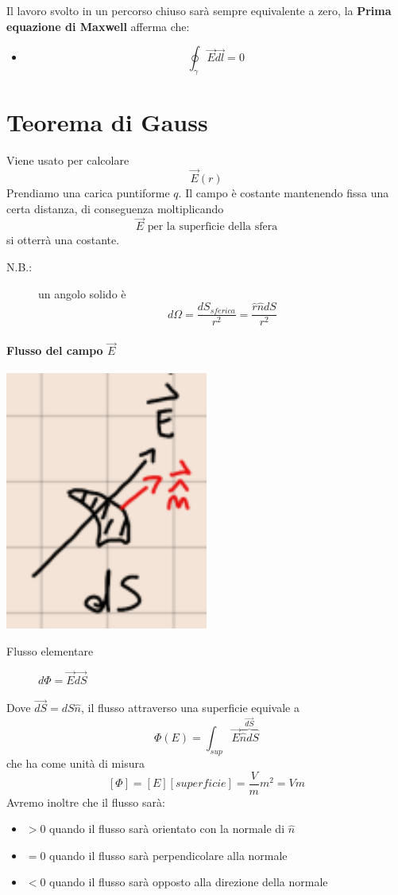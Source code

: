 \documentclass[a4paper, 12pt]{book}
\theoremstyle{plain}
\begin{document}
Il lavoro svolto in un percorso chiuso sarà sempre equivalente a zero, la \textbf{Prima equazione di Maxwell} afferma che:
\begin{itemize}
	\item \[\oint_{\gamma} \vec{E}\vec{dl} = 0 \]
\end{itemize}

\section{Teorema di Gauss}

Viene usato per calcolare \[\vec{E}(r)\] Prendiamo una carica puntiforme $q$. Il campo è costante mantenendo fissa una certa distanza, di conseguenza moltiplicando \[\vec{E}\textrm{ per la superficie della sfera}\] si otterrà una costante.

\begin{description}
	\item[N.B.:] un angolo solido è \[d\Omega = \frac{dS_{sferica}}{r^2} = \frac{\hat{r}\hat{n}dS}{r^2}\]
\end{description}

\paragraph{Flusso del campo $\vec{E}$}

\begin{center}
	\includegraphics[width=0.5\textwidth]{flusso.png}
\end{center}
\begin{description}
	\item[Flusso elementare] $d\Phi = \vec{E}\vec{dS}$
\end{description}
Dove $\vec{dS} = dS\hat{n}$, il flusso attraverso una superficie equivale a \[\Phi(E) = \int_{sup} \vec{E}\overbrace{\hat{n}dS}^{\vec{dS}}\] che ha come unità di misura \[[\Phi] = [E][superficie] = \frac{V}{m}m^2 = Vm\]
Avremo inoltre che il flusso sarà:
\begin{itemize}
	\item $> 0$ quando il flusso sarà orientato con la normale di $\hat{n}$
	\item $= 0$ quando il flusso sarà perpendicolare alla normale
	\item $< 0$ quando il flusso sarà opposto alla direzione della normale
\end{itemize}
\end{document}
